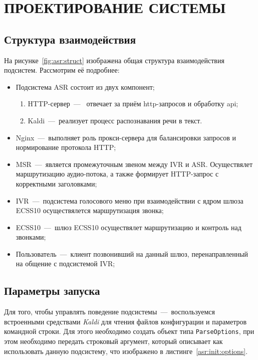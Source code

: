\chapter{ПРОЕКТИРОВАНИЕ СИСТЕМЫ}

\section{Структура взаимодействия}

На рисунке~\ref{fig:asr:struct} изображена общая структура взаимодействия подсистем.
Рассмотрим её подробнее:
\begin{itemize}
    \item Подсистема ASR состоит из двух компонент;
    \begin{enumerate}
        \item HTTP-сервер~---~ отвечает за приём http-запросов и обработку api;
        \item Kaldi~---~реализует процесс распознавания речи в текст.
    \end{enumerate}
    \item Nginx~---~выполняет роль прокси-сервера для балансировки запросов и
        нормирование протокола HTTP;
    \item MSR~---~является промежуточным звеном между IVR и ASR. Осуществялет маршрутизацию
        аудио-потока, а также формирует HTTP-запрос с корректными заголовками;
    \item IVR~---~подсистема голосового меню при взаимодействии с ядром шлюза ECSS10
        осуществялется маршрутизация звонка;
    \item ECSS10~---~шлюз ECSS10 осуществялет маршрутизацию и контроль над звонками;
    \item Пользователь~---~клиент позвонивший на данный шлюз, перенаправленный на
        общение с подсистемой IVR;
\end{itemize}


\section{Параметры запуска}
Для того, чтобы управлять поведение подсистемы~---~воспользуемся встроенными
средствами \textit{Kaldi} для чтения файлов конфигурации и параметров командной
строки. Для этого необходимо создать объект типа \texttt{ParseOptions}, при этом
необходимо передать строковый аргумент, который описывает как использовать данную
подсистему, что изображено в листинге~\ref{asr:init:options}.

